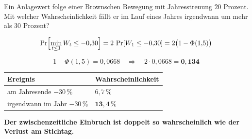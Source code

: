 \begin{aufgabe}
Ein Anlagewert folge einer Brownschen Bewegung mit Jahresstreuung $20$ Prozent. Mit welcher Wahrscheinlichkeit fällt er im Lauf eines Jahres irgendwann um mehr als $30$ Prozent?

\loesung
{}
\[ \Pr\Bigl[\min_{t\le1} W_t \le -0{,}30\Bigr] = 2\,\Pr[W_1 \le -0{,}30] = 2\bigl(1-\Phi(1{,}5)\bigr) \]

\[ 1-\Phi(1{,}5) = 0{,}0668 \quad\Longrightarrow\quad 2\cdot0{,}0668 = \mathbf{0{,}134} \]

\begin{center}
{\small
\renewcommand{\arraystretch}{1.48}
\begin{tabular}{@{}P{3.4cm}P{2.8cm}@{}}
\toprule
\textbf{Ereignis} & \textbf{Wahrschein\-lichkeit}\\
\midrule
am Jahresende $-30\,\%$ & $6{,}7\,\%$\\
irgendwann im Jahr $-30\,\%$ & $\mathbf{13{,}4\,\%}$\\
\bottomrule
\end{tabular}}
\end{center}

\begin{center}
\begin{minipage}{0.9\textwidth}
\textbf{Der zwischenzeitliche Einbruch ist doppelt so wahrscheinlich wie der Verlust am Stichtag.}
\end{minipage}
\end{center}

\begin{center}
\begin{minipage}{0.88\textwidth}
\end{minipage}
\end{center}
\end{aufgabe}

